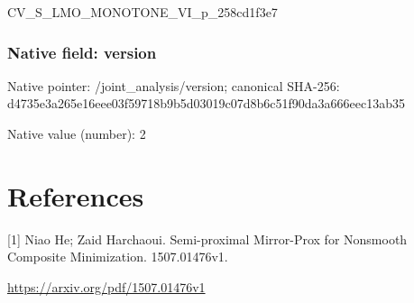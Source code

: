 \documentclass[10pt,a4paper]{article}
\begin{document}
\begingroup\raggedright\sloppy CV\_\allowbreak{}S\_\allowbreak{}LMO\_\allowbreak{}MONOTONE\_\allowbreak{}VI\_\allowbreak{}p\_\allowbreak{}258cd1f3e7\par\endgroup

\subsubsection{Native field: version}
Native pointer: /joint\_\allowbreak{}analysis/version; canonical SHA-256: d4735e3a265e16eee03f59718b9b5d03019c07d8b6c51f90da3a666eec13ab35

Native value (number): 2

\section{References}
[1] Niao He; Zaid Harchaoui. Semi-proximal Mirror-Prox for Nonsmooth Composite Minimization. 1507.01476v1.

\url{https://arxiv.org/pdf/1507.01476v1}
\end{document}
